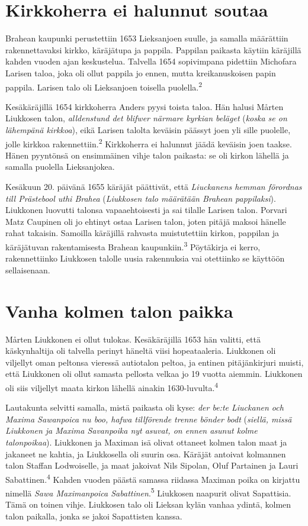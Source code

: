 \documentclass[11pt,a4paper]{article}
\newcommand{\vn}[1]{\textsuperscript{\color{leima}#1}}
\begin{document}
\section{Kirkkoherra ei halunnut soutaa}

Brahean kaupunki perustettiin 1653 Lieksanjoen suulle, ja samalla määrättiin rakennettavaksi kirkko, käräjätupa ja pappila. Pappilan paikasta käytiin käräjillä kahden vuoden ajan keskustelua. Talvella 1654 sopivimpana pidettiin Michofara Larisen taloa, joka oli ollut pappila jo ennen, mutta kreikanuskoisen papin pappila. Larisen talo oli Lieksanjoen toisella puolella.\vn{2}

Kesäkäräjillä 1654 kirkkoherra Anders pyysi toista taloa. Hän halusi Mårten Liukkosen talon, \emph{alldenstund det blifwer närmare kyrkian beläget} (\emph{koska se on lähempänä kirkkoa}), eikä Larisen talolta keväisin päässyt joen yli sille puolelle, jolle kirkkoa rakennettiin.\vn{2} Kirkkoherra ei halunnut jäädä keväisin joen taakse. Hänen pyyntönsä on ensimmäinen vihje talon paikasta: se oli kirkon lähellä ja samalla puolella Lieksanjokea.

Kesäkuun 20. päivänä 1655 käräjät päättivät, että \emph{Liuckanens hemman förordnas till Prästebool uthi Brahea} (\emph{Liukkosen talo määrätään Brahean pappilaksi}). Liukkonen luovutti talonsa vapaaehtoisesti ja sai tilalle Larisen talon. Porvari Matz Caupinen oli jo ehtinyt ostaa Larisen talon, joten pitäjä maksoi hänelle rahat takaisin. Samoilla käräjillä rahvasta muistutettiin kirkon, pappilan ja käräjätuvan rakentamisesta Brahean kaupunkiin.\vn{3} Pöytäkirja ei kerro, rakennettiinko Liukkosen talolle uusia rakennuksia vai otettiinko se käyttöön sellaisenaan.

\section{Vanha kolmen talon paikka}

Mårten Liukkonen ei ollut tulokas. Kesäkäräjillä 1653 hän valitti, että käskynhaltija oli talvella perinyt häneltä viisi hopeataaleria. Liukkonen oli viljellyt oman peltonsa vieressä autiotalon peltoa, ja entinen pitäjänkirjuri muisti, että Liukkonen oli ollut samasta pellosta velkaa jo 19 vuotta aiemmin. Liukkonen oli siis viljellyt maata kirkon lähellä ainakin 1630-luvulta.\vn{4}

Lautakunta selvitti samalla, mistä paikasta oli kyse: \emph{der be:te Liuckanen och Maxima Sawanpoica nu boo, hafwa tillförende trenne bönder bodt} (\emph{siellä, missä Liukkonen ja Maxima Savanpoika nyt asuvat, on ennen asunut kolme talonpoikaa}). Liukkonen ja Maximan isä olivat ottaneet kolmen talon maat ja jakaneet ne kahtia, ja Liukkosella oli suurin osa. Käräjät antoivat kolmannen talon Staffan Lodwoiselle, ja maat jakoivat Nils Sipolan, Oluf Partainen ja Lauri Sabattinen.\vn{4} Kahden vuoden päästä samassa riidassa Maximan poika on kirjattu nimellä \emph{Sawa Maximanpoica Sabattinen}.\vn{5} Liukkosen naapurit olivat Sapattisia. Tämä on toinen vihje. Liukkosen talo oli Lieksan kylän vanhaa ydintä, kolmen talon paikalla, jonka se jakoi Sapattisten kanssa.
\end{document}
